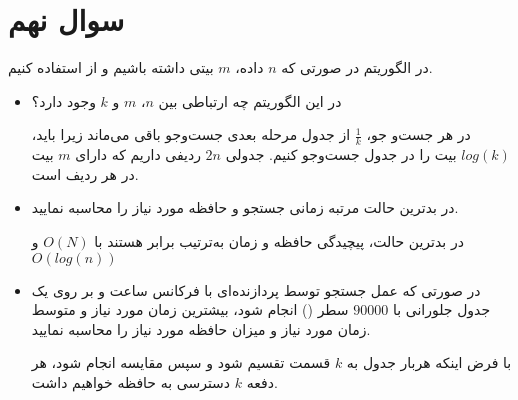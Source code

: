 \section{سوال نهم}

در الگوریتم  در صورتی که $n$ داده، $m$ بیتی داشته باشیم و از  استفاده کنیم.

\begin{itemize}
	\item در این الگوریتم چه ارتباطی بین $n$، $m$ و $k$ وجود دارد؟
	\begin{qsolve}
		در هر جست‌و جو، $\frac{1}{k}$ از جدول مرحله بعدی جست‌و‌جو باقی می‌ماند زیرا باید، $log(k)$ بیت را در جدول جست‌و‌جو کنیم. جدولی $2n$ ردیفی داریم که دارای $m$ بیت در هر ردیف است.
		
	\end{qsolve}
	
	\item در بدترین حالت مرتبه زمانی جستجو و حافظه مورد نیاز را محاسبه نمایید.
	\begin{qsolve}
		در بدترین حالت، پیچیدگی حافظه و زمان به‌ترتیب برابر هستند با $O(N)$ و $O(log(n))$
	\end{qsolve}
	
	\item در صورتی که عمل جستجو توسط پردازنده‌ای با فرکانس ساعت  و بر روی یک جدول جلورانی با \(90000\) سطر () انجام شود، بیشترین زمان مورد نیاز و متوسط زمان مورد نیاز و میزان حافظه مورد نیاز را محاسبه نمایید.
	\begin{qsolve}
		با فرض اینکه هربار جدول به $k$ قسمت تقسیم شود و سپس مقایسه انجام شود، هر دفعه $k$ دسترسی به حافظه خواهیم داشت.
	\end{qsolve}

\end{itemize}


